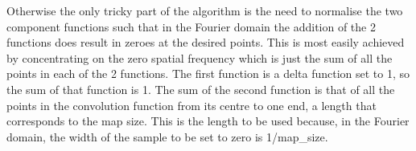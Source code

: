 {{      Otherwise the only tricky part of the algorithm is the need to normalise
      the two component functions such that in the Fourier domain the
      addition of the 2 functions does result in zeroes at the desired points.
      This is most easily achieved by concentrating on the zero spatial
      frequency which is just the sum of all the points in each of the 2
      functions. The first function is a delta function set to 1, so the
      sum of that function is 1. The sum of the second function is that of
      all the points in the convolution function from its centre to one end,
      a length that corresponds to the map size. This is the length to be
      used because, in the Fourier domain, the width of the sample to be
      set to zero is 1/map\_size.
   }
}

